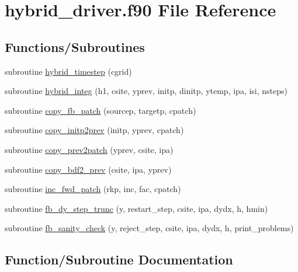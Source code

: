 \hypertarget{hybrid__driver_8f90}{}\section{hybrid\+\_\+driver.\+f90 File Reference}
\label{hybrid__driver_8f90}
\subsection*{Functions/\+Subroutines}
\begin{DoxyCompactItemize}
\item 
subroutine \hyperlink{hybrid__driver_8f90_a9df1061f35d458ad00001665377c1680}{hybrid\+\_\+timestep} (cgrid)
\item 
subroutine \hyperlink{hybrid__driver_8f90_aca3362e241d7c44f74025a34d75c9925}{hybrid\+\_\+integ} (h1, csite, yprev, initp, dinitp, ytemp, ipa, isi, nsteps)
\item 
subroutine \hyperlink{hybrid__driver_8f90_a6108ac8269b762a14258cffcf336d210}{copy\+\_\+fb\+\_\+patch} (sourcep, targetp, cpatch)
\item 
subroutine \hyperlink{hybrid__driver_8f90_a6dd1049ed30fa89e8142c536050401c4}{copy\+\_\+initp2prev} (initp, yprev, cpatch)
\item 
subroutine \hyperlink{hybrid__driver_8f90_a6f82a6d32d5c2c22a4423e4120179d28}{copy\+\_\+prev2patch} (yprev, csite, ipa)
\item 
subroutine \hyperlink{hybrid__driver_8f90_a6e616b8d397c140a91dc2c5daad993cf}{copy\+\_\+bdf2\+\_\+prev} (csite, ipa, yprev)
\item 
subroutine \hyperlink{hybrid__driver_8f90_aeef05e776ee6f7f37ccd5438078c4652}{inc\+\_\+fwd\+\_\+patch} (rkp, inc, fac, cpatch)
\item 
subroutine \hyperlink{hybrid__driver_8f90_a2daa99581dfa5a77ce3305e89cbe7ad1}{fb\+\_\+dy\+\_\+step\+\_\+trunc} (y, restart\+\_\+step, csite, ipa, dydx, h, hmin)
\item 
subroutine \hyperlink{hybrid__driver_8f90_a3103110caad78e9e2f5f0b796f34fc59}{fb\+\_\+sanity\+\_\+check} (y, reject\+\_\+step, csite, ipa, dydx, h,                   print\+\_\+problems)
\end{DoxyCompactItemize}


\subsection{Function/\+Subroutine Documentation}

